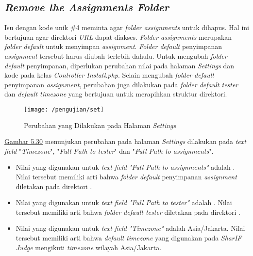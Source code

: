 	\subsection{\textit{Remove the Assignments Folder}}
	Isu dengan kode unik \#4 meminta agar \textit{folder assignments} untuk dihapus. Hal ini bertujuan agar direktori \textit{URL}  dapat diakses. \textit{Folder assignments} merupakan \textit{folder default} untuk menyimpan \textit{assignment}. \textit{Folder default} penyimpanan \textit{assignment} tersebut harus diubah terlebih dahulu. Untuk mengubah \textit{folder default} penyimpanan, diperlukan perubahan nilai pada halaman \textit{Settings} dan kode pada kelas \textit{Controller Install.php}. Selain mengubah \textit{folder default} penyimpanan \textit{assignment}, perubahan juga dilakukan pada \textit{folder default tester} dan \textit{default timezone} yang bertujuan untuk merapihkan struktur direktori.
	\begin{figure}[H]
		\centering  
		\texttt{[image: /pengujian/set]}  
		\caption[Perubahan yang Dilakukan pada Halaman \textit{Settings}]{Perubahan yang Dilakukan pada Halaman \textit{Settings}} 
		\label{fig:set} 
	\end{figure}
	
	\hyperref[fig:set]{Gambar 5.30} menunjukan perubahan pada halaman \textit{Settings} dilakukan pada \textit{text field} "\textit{Timezone}", "\textit{Full Path to tester}" dan "\textit{Full Path to assignments}". 
	\begin{itemize}
		\item Nilai yang digunakan untuk\textit{ text field "Full Path to assignments"} adalah . Nilai tersebut memiliki arti bahwa \textit{folder default} penyimpanan \textit{assignment} diletakan pada direktori .
		\item Nilai yang digunakan untuk \textit{text field "Full Path to tester"} adalah . Nilai tersebut memiliki arti bahwa \textit{folder default tester} diletakan pada direktori .
		\item Nilai yang digunakan untuk \textit{text field "Timezone"} adalah Asia/Jakarta. Nilai tersebut memiliki arti bahwa \textit{default timezone} yang digunakan pada \textit{SharIF Judge} mengikuti \textit{timezone} wilayah Asia/Jakarta.
	\end{itemize}
	
